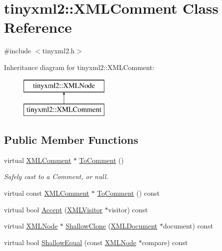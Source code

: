 \hypertarget{classtinyxml2_1_1_x_m_l_comment}{}\section{tinyxml2\+:\+:X\+M\+L\+Comment Class Reference}
\label{classtinyxml2_1_1_x_m_l_comment}


{\ttfamily \#include $<$tinyxml2.\+h$>$}

Inheritance diagram for tinyxml2\+:\+:X\+M\+L\+Comment\+:\begin{figure}[H]
\begin{center}
\leavevmode
\includegraphics[height=2.000000cm]{classtinyxml2_1_1_x_m_l_comment}
\end{center}
\end{figure}
\subsection*{Public Member Functions}
\begin{DoxyCompactItemize}
\item 
virtual \hyperlink{classtinyxml2_1_1_x_m_l_comment}{X\+M\+L\+Comment} $\ast$ \hyperlink{classtinyxml2_1_1_x_m_l_comment_a8093e1dc8a34fa446d9dc3fde0e6c0ee}{To\+Comment} ()
\begin{DoxyCompactList}\small\item\em Safely cast to a Comment, or null. \end{DoxyCompactList}\item 
virtual const \hyperlink{classtinyxml2_1_1_x_m_l_comment}{X\+M\+L\+Comment} $\ast$ \hyperlink{classtinyxml2_1_1_x_m_l_comment_a8e60caf06d8e88876a94b81db026b85c}{To\+Comment} () const
\item 
virtual bool \hyperlink{classtinyxml2_1_1_x_m_l_comment_a27b37d16cea01b5329dfbbb4f9508e39}{Accept} (\hyperlink{classtinyxml2_1_1_x_m_l_visitor}{X\+M\+L\+Visitor} $\ast$visitor) const
\item 
virtual \hyperlink{classtinyxml2_1_1_x_m_l_node}{X\+M\+L\+Node} $\ast$ \hyperlink{classtinyxml2_1_1_x_m_l_comment_adf5b5c0319351dcc339df098d11e8fb2}{Shallow\+Clone} (\hyperlink{classtinyxml2_1_1_x_m_l_document}{X\+M\+L\+Document} $\ast$document) const
\item 
virtual bool \hyperlink{classtinyxml2_1_1_x_m_l_comment_a965d880a99d58dd915caa88dc37a9b51}{Shallow\+Equal} (const \hyperlink{classtinyxml2_1_1_x_m_l_node}{X\+M\+L\+Node} $\ast$compare) const
\end{DoxyCompactItemize}
